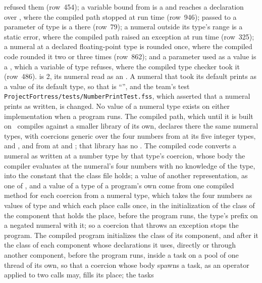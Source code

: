 \begin{description}
refused them (row~454); a variable bound from  is a
 and reaches a declaration over , where the
compiled path stopped at run time (row~946);  passed to a parameter of
type  is a  there (row~79); a numeral outside its
type's range is a static error, where the compiled path raised an exception at
run time (row~325); a numeral at a declared floating-point type is rounded once,
where the compiled code rounded it two or three times (row~862); and a
 parameter used as a value is a , which a variable of
type  refuses, where the compiled type checker took it
(row~486).
 is 2, its numeral read as an
.
A numeral that took its default prints as a value of its default type, so that
 is \hbox{\rm``''}, and the team's test
\nolinkurl{ProjectFortress/tests/NumberPrintTest.fss}, which asserted that a
numeral prints as written, is changed.
No value of a numeral type exists on either implementation when a program runs.
The compiled path, which until it is built on \library\ compiles against a
smaller library of its own, declares there the same numeral types, with
coercions generic over the four numbers from  at its five
integer types,  and , and from
 at  and ; that
library has no .
The compiled code converts a numeral as written at a number type by that type's
coercion, whose body the compiler evaluates at the numeral's four numbers with
no knowledge of the type, into the constant that the class file holds; a value
of another representation, as one of , and a value of a type of
a program's own come from one compiled method for each coercion from a numeral
type, which takes the four numbers as values of type  and which
each place calls once, in the initialization of the class of the component that
holds the place, before the program runs, the type's prefix \EXP{-} on a
negated numeral with it; so a coercion that throws an exception stops the
program.
The compiled program initializes the class of its component, and after it the
class of each component whose declarations it uses, directly or through
another component, before the program runs, inside a
task on a pool of one thread of its own, so that a coercion whose body spawns
a task, as an operator applied to two calls may, fills its place; the tasks

\end{description}
